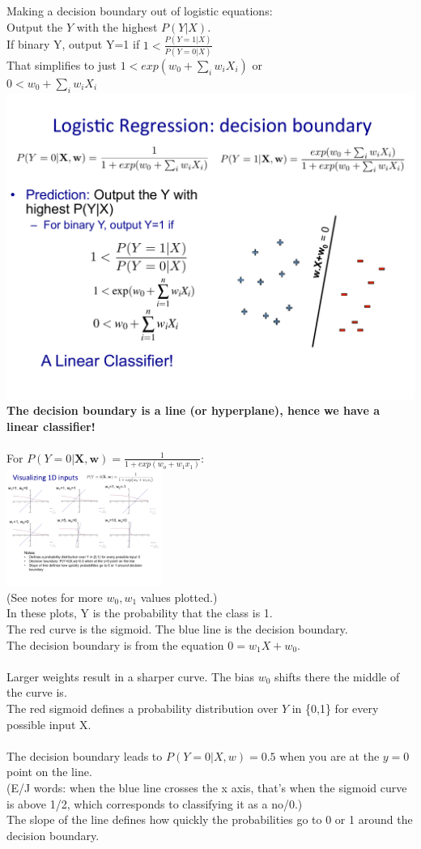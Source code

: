 Making a decision boundary out of logistic equations:  \hfill \\
Output the $Y$ with the highest $P(Y|X)$.   \hfill \\
If binary Y, output Y=1 if $\displaystyle 1 < \frac{P(Y=1|X)}{P(Y=0|X)}$  \hfill \\
That simplifies to just $1 <exp(w_0 + \sum_i w_i X_i)$ or \hfill \\
$0 <w_0 + \sum_i w_i X_i$   \hfill \\
\includegraphics[width=.8in]{figures/logistic_boundary_linear.pdf}     \hfill \\
\textbf{The decision boundary is a line (or hyperplane), hence we have a linear classifier!} \hfill \\  \hfill \\

For $ \displaystyle P(Y=0 | \bm{X,w}) = \frac{1}{1 + exp(w_o + w_1 x_1)}$:  \hfill \\
\includegraphics[width=2in]{figures/decision_boundary_example.pdf}   \hfill \\
(See notes for more $w_0, w_1$ values plotted.)  \hfill \\
In these plots, Y is the probability that the class is 1.    \hfill \\
The red curve is the sigmoid.  The blue line is the decision boundary.  \hfill \\
The decision boundary is from the equation $0 = w_1X + w_0$.  \hfill \\

\hfill \\
Larger weights result in a sharper curve.  The bias $w_0$ shifts there the middle of the curve is.   \hfill \\
The red sigmoid defines a probability distribution over $Y$ in \{0,1\} for every possible input X. \hfill \\
\hfill \\
The decision boundary leads to $P(Y=0|X, w) = 0.5$ when you are at the $y=0$ point on the line.   \hfill \\
(E/J words:  when the blue line crosses the x axis, that's when the sigmoid curve is above 1/2, which corresponds to classifying it as a no/0.)  \hfill \\
The slope of the line defines how quickly the probabilities go to 0 or 1 around the decision boundary. 
\hfill \\

